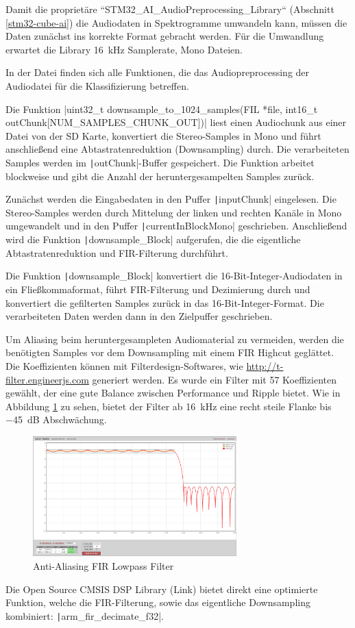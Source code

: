 Damit die proprietäre ``STM32\_AI\_AudioPreprocessing\_Library`` (Abschnitt \ref{stm32-cube-ai}) die Audiodaten in Spektrogramme umwandeln kann, müssen die Daten zunächst ins korrekte Format gebracht werden. Für die Umwandlung erwartet die Library \SI{16}{\kilo\hertz} Samplerate, Mono Dateien.

In der Datei
finden sich alle Funktionen, die das Audiopreprocessing der Audiodatei für die Klassifizierung betreffen.

Die Funktion 
|uint32_t downsample_to_1024_samples(FIL *file, int16_t outChunk[NUM_SAMPLES_CHUNK_OUT])|
liest einen Audiochunk aus einer Datei von der SD Karte, konvertiert die Stereo-Samples in Mono und führt anschließend eine Abtastratenreduktion (Downsampling) durch. Die verarbeiteten Samples werden im \texttt|outChunk|-Buffer gespeichert. Die Funktion arbeitet blockweise und gibt die Anzahl der heruntergesampelten Samples zurück. 

Zunächst werden die Eingabedaten in den Puffer \texttt|inputChunk| eingelesen. Die Stereo-Samples werden durch Mittelung der linken und rechten Kanäle in Mono umgewandelt und in den Puffer \texttt|currentInBlockMono| geschrieben. Anschließend wird die Funktion \texttt|downsample_Block| aufgerufen, die die eigentliche Abtastratenreduktion und FIR-Filterung durchführt.

Die Funktion \texttt|downsample_Block| konvertiert die 16-Bit-Integer-Audiodaten in ein Fließkommaformat, führt FIR-Filterung und Dezimierung durch und konvertiert die gefilterten Samples zurück in das 16-Bit-Integer-Format. Die verarbeiteten Daten werden dann in den Zielpuffer geschrieben.

Um Aliasing beim heruntergesampleten Audiomaterial zu vermeiden, werden die benötigten Samples vor dem Downsampling mit einem FIR Highcut geglättet. 
Die Koeffizienten können mit Filterdesign-Softwares, wie \url{http://t-filter.engineerjs.com} generiert werden. Es wurde ein Filter mit 57 Koeffizienten gewählt, der eine gute Balance zwischen Performance und Ripple bietet. 
Wie in Abbildung \ref{fig:fir-filter} zu sehen, bietet der Filter ab \SI{16}{\kilo\hertz} eine recht steile Flanke bis \SI{-45}{\deci\bel} Abschwächung.

\begin{figure}[h!]
	\centering
	\includegraphics[width=0.7\textwidth]{images/08_durchfuehrung/audio/fir_lowpass.png}
	\caption{Anti-Aliasing FIR Lowpass Filter}
	\label{fig:fir-filter}
\end{figure}

Die Open Source CMSIS DSP Library (Link) bietet direkt eine optimierte Funktion, welche die FIR-Filterung, sowie das eigentliche Downsampling kombiniert: \texttt|arm_fir_decimate_f32|.


